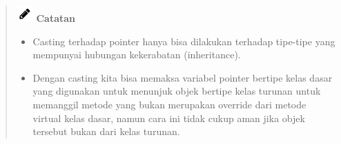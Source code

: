 \begin{quotation}
	\includegraphics{../manuscript/images/pencil} \textbf{Catatan} 
	\begin{itemize}
		\item Casting terhadap pointer hanya bisa dilakukan terhadap tipe-tipe yang
		mempunyai hubungan kekerabatan (inheritance).
		\item  Dengan
		casting kita bisa memaksa variabel pointer bertipe kelas dasar yang
		digunakan untuk menunjuk objek bertipe kelas turunan untuk memanggil
		metode yang bukan merupakan override dari metode virtual kelas dasar,
		namun cara ini tidak cukup aman jika objek tersebut bukan dari kelas
		turunan.
	\end{itemize}
\end{quotation}


